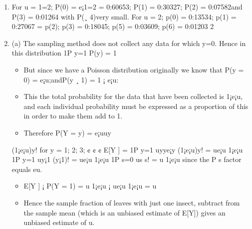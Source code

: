 \documentclass[a4paper,12pt]{article}
\begin{document}
\begin{enumerate}
    \item  For u = 1=2; P(0) = e¡1=2 = 0:60653; P(1) = 0:30327; P(2) = 0:07582and P(3) =
0:01264 with P(¸ 4)very small.
For u = 2; p(0) = 0:13534; p(1) = 0:27067 = p(2); p(3) = 0:18045; p(5) = 0:03609; p(6) =
0:01203
2
\item  (a) The sampling method does not collect any data for which y=0. Hence in this distribution
1P
y=1
P(y) = 1
\begin{itemize}
\item But since we have a Poisson distribution originally we know that P(y = 0) =
e¡u;andP(y ¸ 1) = 1 ¡ e¡u:
\item This the total probability for the data that have been collected is 1¡e¡u, and each
individual probability must be expressed as a proportion of this in order to make
them add to 1.
\item 
Therefore P(Y = y) = e¡uuy
\end{itemize}

(1¡e¡u)y! for y = 1; 2; 3; ¢ ¢ ¢
E[Y ] =
1P
y=1
uyye¡y
(1¡e¡u)y! = ue¡u
1¡e¡u
1P
y=1
uy¡1
(y¡1)! = ue¡u
1¡e¡u
1P
s=0
us
s! = u
1¡e¡u since the
P
s factor
equals eu.
\begin{itemize}
\item E[Y ] ¡ P(Y = 1) = u
1¡e¡u ¡ ue¡u
1¡e¡u = u
\item Hence the sample fraction of leaves with just one insect, subtract from the sample
mean (which is an unbiased estimate of E[Y]) gives an unbiased estimate of u.
\end{itemize}
\end{enumerate}
\end{document}
